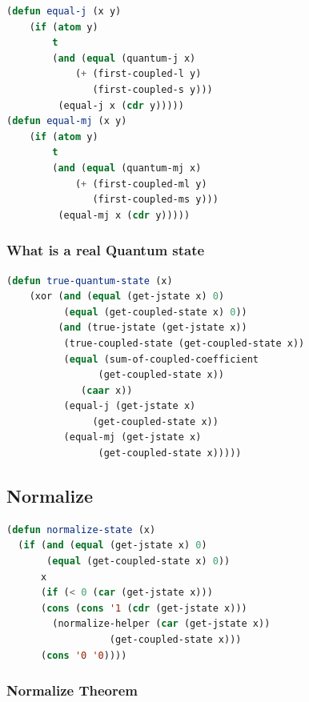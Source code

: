 \documentclass[
paper=128mm:96mm, %
fontsize=11pt, %
pagesize, %
parskip=half-, %
]{scrartcl} %
\theoremstyle{mythmstyle} %
\begin{document}
\clearpage

\begin{lstlisting}[language=Lisp,breaklines=true]
(defun equal-j (x y)
	(if (atom y)
	    t
	    (and (equal (quantum-j x)
			(+ (first-coupled-l y)
			   (first-coupled-s y)))
		 (equal-j x (cdr y)))))
(defun equal-mj (x y)
	(if (atom y)
	    t
	    (and (equal (quantum-mj x)
			(+ (first-coupled-ml y)
			   (first-coupled-ms y)))
		 (equal-mj x (cdr y)))))
\end{lstlisting}

\clearpage

\subsubsection{What is a real Quantum state}

\begin{lstlisting}[language=Lisp,breaklines=true]
(defun true-quantum-state (x)
	(xor (and (equal (get-jstate x) 0)
		  (equal (get-coupled-state x) 0))
	     (and (true-jstate (get-jstate x))
		  (true-coupled-state (get-coupled-state x))
		  (equal (sum-of-coupled-coefficient 
				(get-coupled-state x))
			 (caar x))
		  (equal-j (get-jstate x) 
			   (get-coupled-state x))
		  (equal-mj (get-jstate x)
			    (get-coupled-state x)))))
\end{lstlisting}

\clearpage

\subsection{Normalize}

\begin{lstlisting}[language=Lisp,breaklines=true]
(defun normalize-state (x)
  (if (and (equal (get-jstate x) 0)
	   (equal (get-coupled-state x) 0))
      x
      (if (< 0 (car (get-jstate x)))
	  (cons (cons '1 (cdr (get-jstate x)))
		(normalize-helper (car (get-jstate x)) 
			      (get-coupled-state x)))
	  (cons '0 '0))))	
\end{lstlisting}


\clearpage

\subsubsection{Normalize Theorem}
\end{document}
